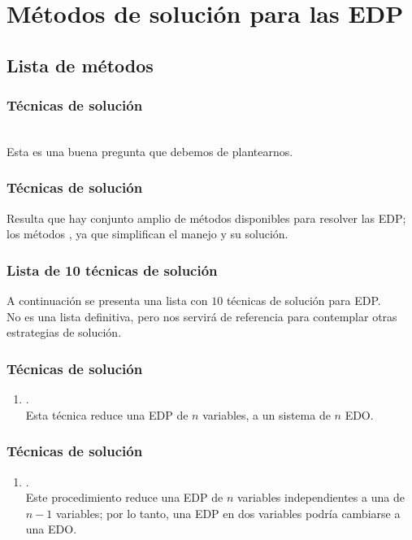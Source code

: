 \documentclass[12pt]{beamer}
\begin{document}
\section{Métodos de solución para las EDP}
\subsection{Lista de métodos}

\begin{frame}
\frametitle{Técnicas de solución}
\\
\bigskip
\pause
Esta es una buena pregunta que debemos de plantearnos.
\end{frame}
\begin{frame}
\frametitle{Técnicas de solución}
Resulta que hay conjunto amplio de métodos disponibles para resolver las EDP; los métodos , ya que simplifican el manejo y su solución.
\end{frame}
\begin{frame}
\frametitle{Lista de 10 técnicas de solución}
A continuación se presenta una lista con $10$ técnicas de solución para EDP.
\\
\bigskip
\pause
No es una lista definitiva, pero nos servirá de referencia para contemplar otras estrategias de solución.
\end{frame}
\begin{frame}
\frametitle{Técnicas de solución}
\begin{enumerate}
\item {}.
\\
\bigskip
Esta técnica reduce una EDP de $n$ variables, a un sistema de $n$ EDO.
\seti
\end{enumerate}
\end{frame}
\begin{frame}
\frametitle{Técnicas de solución}
\begin{enumerate}
\conti
\item {}. 
\\
\bigskip
Este procedimiento reduce una EDP de $n$ variables independientes a una de $n - 1$ variables; por lo tanto, una EDP en dos variables podría cambiarse a una EDO.
\seti
\end{enumerate}
\end{frame}
\end{document}
